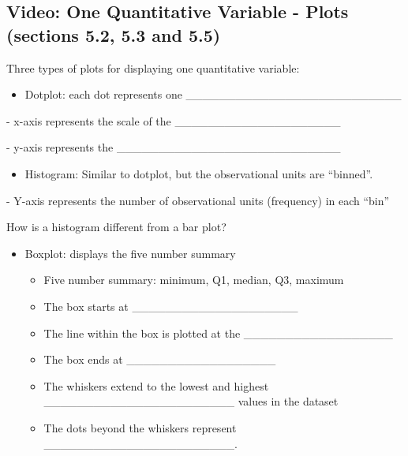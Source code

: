 \documentclass[
]{report}
\providecommand{\tightlist}{%
  \setlength{\itemsep}{0pt}\setlength{\parskip}{0pt}}
\newcommand{\rgi}{\hspace{24pt}}  %
\begin{document}

\subsection*{Video: One Quantitative Variable - Plots (sections 5.2, 5.3 and 5.5)}\label{video-one-quantitative-variable---plots-sections-5.2-5.3-and-5.5}

Three types of plots for displaying one quantitative variable:


\begin{itemize}
\tightlist
\item
  Dotplot: each dot represents one \_\_\_\_\_\_\_\_\_\_\_\_\_\_\_\_\_\_\_\_\_\_\_\_\_\_
\end{itemize}

\rgi \rgi - x-axis represents the scale of the \_\_\_\_\_\_\_\_\_\_\_\_\_\_\_\_\_\_\_\_

\rgi \rgi - y-axis represents the \_\_\_\_\_\_\_\_\_\_\_\_\_\_\_\_\_\_\_\_\_\_\_\_\_\_\_

\begin{itemize}
\tightlist
\item
  Histogram: Similar to dotplot, but the observational units are ``binned''.
\end{itemize}

\rgi \rgi - Y-axis represents the number of observational units (frequency) in each ``bin''

\rgi \rgi How is a histogram different from a bar plot?

\vspace{0.3in}

\begin{itemize}
\item
  Boxplot: displays the five number summary

  \begin{itemize}
  \item
    Five number summary: minimum, Q1, median, Q3, maximum
  \item
    The box starts at \_\_\_\_\_\_\_\_\_\_\_\_\_\_\_\_\_\_\_\_
  \item
    The line within the box is plotted at the \_\_\_\_\_\_\_\_\_\_\_\_\_\_\_\_\_\_
  \item
    The box ends at \_\_\_\_\_\_\_\_\_\_\_\_\_\_\_\_\_\_
  \item
    The whiskers extend to the lowest and highest \_\_\_\_\_\_\_\_\_\_\_\_\_\_\_\_\_\_\_\_\_\_\_ values in the dataset
  \item
    The dots beyond the whiskers represent \_\_\_\_\_\_\_\_\_\_\_\_\_\_\_\_\_\_\_\_\_\_\_.
  \end{itemize}
\end{itemize}
\end{document}
